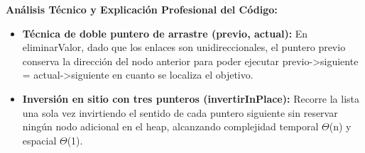 \documentclass[11pt,letterpaper]{article}
\begin{document}
\noindent\textbf{\color{ipnguinda}Análisis Técnico y Explicación Profesional del Código:}\par\vspace{-2pt}
\begin{itemize}
\setlength{\itemsep}{2pt}\setlength{\parskip}{0pt}
  \item \textbf{Técnica de doble puntero de arrastre (previo, actual): }En eliminarValor, dado que los enlaces son unidireccionales, el puntero previo conserva la dirección del nodo anterior para poder ejecutar previo->siguiente = actual->siguiente en cuanto se localiza el objetivo.
  \item \textbf{Inversión en sitio con tres punteros (invertirInPlace): }Recorre la lista una sola vez invirtiendo el sentido de cada puntero siguiente sin reservar ningún nodo adicional en el heap, alcanzando complejidad temporal $\Theta$(n) y espacial $\Theta$(1).
\end{itemize}
\end{document}
